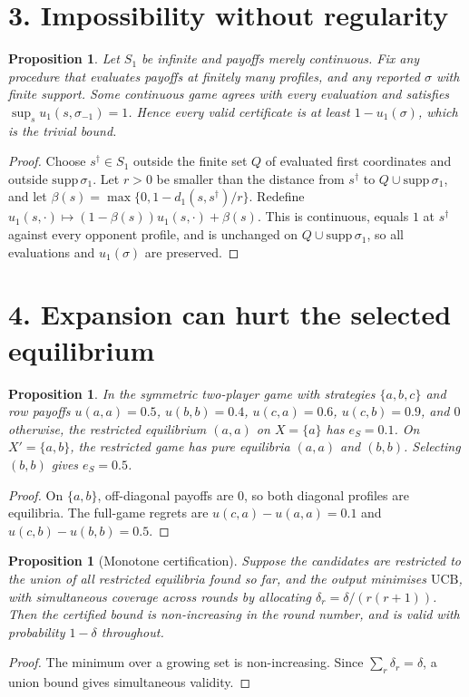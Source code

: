 \documentclass[11pt]{article}
\newtheorem{proposition}[theorem]{Proposition}
\theoremstyle{definition}
\begin{document}
\section*{3. Impossibility without regularity}
\begin{proposition}\label{prop:imp}
Let $S_1$ be infinite and payoffs merely continuous. Fix any procedure that evaluates payoffs at finitely many profiles,
and any reported $\sigma$ with finite support. Some continuous game agrees with every evaluation and satisfies
$\sup_{s}u_1(s,\sigma_{-1})=1$. Hence every valid certificate is at least $1-u_1(\sigma)$, which is the trivial bound.
\end{proposition}
\begin{proof}
Choose $s^\dagger\in S_1$ outside the finite set $Q$ of evaluated first coordinates and outside $\mathrm{supp}\,\sigma_1$.
Let $r>0$ be smaller than the distance from $s^\dagger$ to $Q\cup\mathrm{supp}\,\sigma_1$, and let
$\beta(s)=\max\{0,1-d_1(s,s^\dagger)/r\}$. Redefine
$u_1(s,\cdot)\mapsto(1-\beta(s))u_1(s,\cdot)+\beta(s)$. This is continuous, equals $1$ at $s^\dagger$ against every
opponent profile, and is unchanged on $Q\cup\mathrm{supp}\,\sigma_1$, so all evaluations and $u_1(\sigma)$ are preserved.
\end{proof}

\section*{4. Expansion can hurt the selected equilibrium}
\begin{proposition}\label{prop:hurt}
In the symmetric two-player game with strategies $\{a,b,c\}$ and row payoffs $u(a,a)=0.5$, $u(b,b)=0.4$,
$u(c,a)=0.6$, $u(c,b)=0.9$, and $0$ otherwise, the restricted equilibrium $(a,a)$ on $X=\{a\}$ has $e_S=0.1$. On
$X'=\{a,b\}$, the restricted game has pure equilibria $(a,a)$ and $(b,b)$. Selecting $(b,b)$ gives $e_S=0.5$.
\end{proposition}
\begin{proof}
On $\{a,b\}$, off-diagonal payoffs are $0$, so both diagonal profiles are equilibria. The full-game regrets are
$u(c,a)-u(a,a)=0.1$ and $u(c,b)-u(b,b)=0.5$.
\end{proof}
\begin{proposition}[Monotone certification]\label{prop:mono}
Suppose the candidates are restricted to the union of all restricted equilibria found so far, and the output minimises
$\mathrm{UCB}$, with simultaneous coverage across rounds by allocating $\delta_r=\delta/(r(r+1))$. Then the certified bound is
non-increasing in the round number, and is valid with probability $1-\delta$ throughout.
\end{proposition}
\begin{proof}
The minimum over a growing set is non-increasing. Since $\sum_r\delta_r=\delta$, a union bound gives simultaneous validity.
\end{proof}
\end{document}
